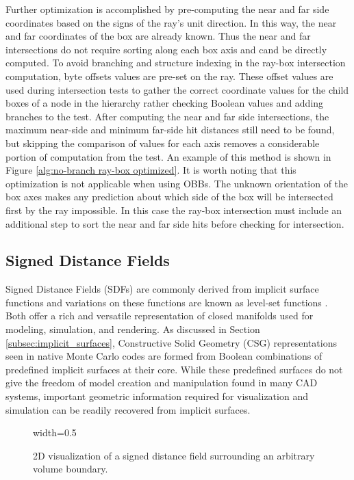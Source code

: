 Further optimization is accomplished by pre-computing the near and far side
coordinates based on the signs of the ray's unit direction. In this way, the
near and far coordinates of the box are already known. Thus the near and far
intersections do not require sorting along each box axis and cand be directly
computed. To avoid branching and structure indexing in the ray-box intersection
computation, byte offsets values are pre-set on the ray. These offset values are
used during intersection tests to gather the correct coordinate values for the
child boxes of a node in the hierarchy rather checking Boolean values and adding
branches to the test. After computing the near and far side intersections, the
maximum near-side and minimum far-side hit distances still need to be found, but
skipping the comparison of values for each axis removes a considerable portion
of computation from the test. An example of this method is shown in Figure
\ref{alg:no-branch ray-box optimized}. It is worth noting that this optimization
is not applicable when using OBBs. The unknown orientation of the box axes makes any
prediction about which side of the box will be intersected first by the ray
impossible. In this case the ray-box intersection must include an additional
step to sort the near and far side hits before checking for intersection.

\subsection{Signed Distance Fields}

Signed Distance Fields (SDFs) are commonly derived from implicit surface
functions and variations on these functions are known as level-set functions
\cite{Osher_2003}. Both offer a rich and versatile representation of closed
manifolds used for modeling, simulation, and rendering. As discussed in Section
\ref{subsec:implicit_surfaces}, Constructive Solid Geometry (CSG)
representations seen in native Monte Carlo codes are formed from Boolean
combinations of predefined implicit surfaces at their core. While these
predefined surfaces do not give the freedom of model creation and manipulation
found in many CAD systems, important geometric information required for
visualization and simulation can be readily recovered from implicit surfaces.

\begin{figure}[H]
  {width=0.5\textwidth}
  \centering
  \caption[2D depiction of a signed distance field.]{2D visualization of a signed distance field surrounding an arbitrary volume boundary.}
  \label{fig:preconditioner_datastruct}
\end{figure}



